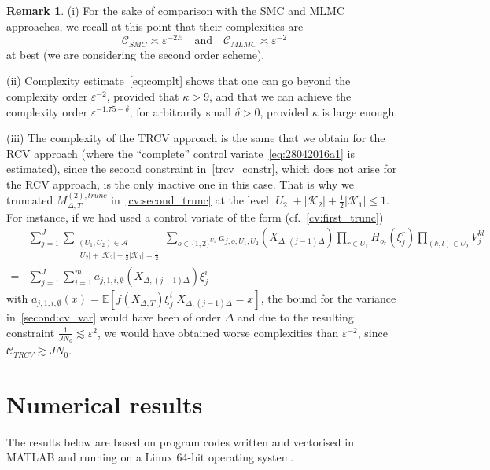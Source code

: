\documentclass[11pt,a4paper]{amsart}
\theoremstyle{plain}
\theoremstyle{definition}
\newtheorem{remark}[theorem]{Remark}
\theoremstyle{remark}
\numberwithin{equation}{section}
\newcommand*{\EE}{\mathbb E}
\newcommand*{\cA}{\mathcal A}
\begin{document}
\begin{remark}
(i) For the sake of comparison with the SMC and MLMC approaches,
we recall at this point that their complexities are
$$
\mathcal C_{SMC}\asymp\varepsilon^{-2.5}
\quad\text{and}\quad
\mathcal C_{MLMC}\asymp\varepsilon^{-2}
$$
at best (we are considering the second order scheme).

(ii) Complexity estimate~\eqref{eq:complt}
shows that one can go beyond the complexity order
$\varepsilon^{-2}$, provided that $\kappa>9$,
and that we can achieve the complexity order
$\varepsilon^{-1.75-\delta}$,
for arbitrarily small $\delta>0$,
provided $\kappa$ is large enough.

(iii) The complexity of the TRCV approach
is the same that we obtain for the RCV approach (where the ``complete'' control variate~\eqref{eq:28042016a1} is estimated), since the second constraint in~\eqref{trcv_constr}, which does not arise for the RCV approach, is the only inactive one in this case. That is why we truncated $M_{\Delta,T}^{(2),trunc}$ in~\eqref{cv:second_trunc} at the level $\left|U_2\right|+\left|\mathcal{K}_2\right|+\frac{1}{2}\left|\mathcal{K}_1\right|\le 1$.
For instance, if we had used a control variate of the form (cf.~\eqref{cv:first_trunc})
\begin{align*}
&\sum_{j=1}^J
\sum_{\substack{(U_1,U_2)\in\cA\\ \left|U_2\right|+\left|\mathcal{K}_2\right|+\frac{1}{2}\left|\mathcal{K}_1\right|= \frac{1}{2}}}
\sum_{o\in\{1,2\}^{U_1}}
a_{j,o,U_1,U_2}(X_{\Delta,(j-1)\Delta})
\prod_{r\in U_1} H_{o_r}(\xi_j^r)
\prod_{(k,l)\in U_2} V_j^{kl}\\
=&\sum_{j=1}^J\sum_{i=1}^ma_{j,1,i,\emptyset}(X_{\Delta,(j-1)\Delta})
\xi_j^i
\end{align*}
with $a_{j,1,i,\emptyset}(x)=\EE\left[f(X_{\Delta,T})\xi_j^i\left|\right.X_{\Delta,(j-1)\Delta}=x\right]$, 
the bound for the variance in~\eqref{second:cv_var}
would have been of order $\Delta$ and due to the resulting constraint $\frac{1}{JN_0}\lesssim\varepsilon^2$, we would have obtained worse complexities than $\varepsilon^{-2}$, since $\mathcal{C}_{TRCV}\gtrsim JN_0$.
\end{remark}








\section{Numerical results}
\label{sec:num}
The results below are based on program codes written and vectorised in MATLAB and running on a Linux 64-bit operating system.
\end{document}
